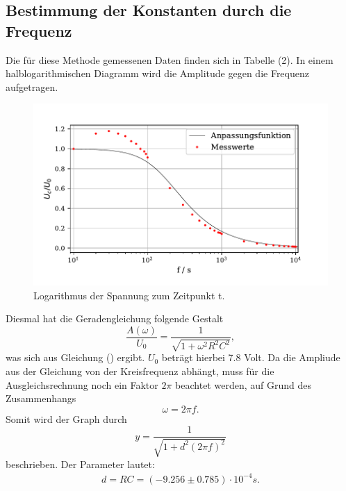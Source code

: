 \subsection{Bestimmung der Konstanten durch die Frequenz}
Die für diese Methode gemessenen Daten finden sich in Tabelle (2). 
In einem halblogarithmischen Diagramm wird die Amplitude gegen die Frequenz aufgetragen.

\begin{figure}
  \centering
  \includegraphics{plot2.pdf}
  \caption{Logarithmus der Spannung zum Zeitpunkt t.}
  \label{fig:plot}
\end{figure}

\noindent Diesmal hat die Geradengleichung folgende Gestalt
\begin{equation*}
    \frac{A(\omega)}{U_0} = \frac{1}{ \sqrt{1+\omega^2R^2C^2}} ,
\end{equation*}
was sich aus Gleichung () ergibt. $U_0$ beträgt hierbei 7.8 Volt. Da die Ampliude aus der Gleichung von der Kreisfrequenz abhängt, 
muss für die Ausgleichsrechnung noch ein Faktor $2\pi$ beachtet werden, auf Grund des Zusammenhangs
\begin{equation}
    \omega = 2\pi f .
\end{equation}
Somit wird der Graph durch
\begin{equation}
    y = \frac{1}{ \sqrt{1+d^2(2\pi f)^2}} 
\end{equation}
beschrieben.
Der Parameter lautet:
\begin{align*}
   d = RC = (-9.256\pm  0.785)\cdot 10^{-4} s .
\end{align*}


